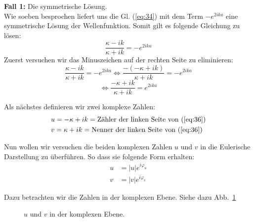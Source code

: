 \textbf{ Fall 1:} Die symmetrische Lösung.\\
Wie soeben besprochen liefert uns die Gl. (\ref{eq:34}) mit dem Term $-e^{2ika}$
eine symmetrische Lösung der Wellenfunktion. Somit gilt es folgende Gleichung zu
lösen:
\begin{equation}
  \label{eq:35}
  \frac{\kappa-ik}{\kappa+ik}=-e^{2ika}
\end{equation}
Zuerst versuchen wir das Minuszeichen auf der rechten Seite zu eliminieren:
\begin{equation*}
  \frac{\kappa-ik}{\kappa+ik}=-e^{2ika}
  \Leftrightarrow  
 \frac{-(-\kappa+ik)}{\kappa+ik}=-e^{2ika}
\end{equation*}
\begin{equation}
  \label{eq:36}
  \Leftrightarrow \frac{-\kappa+ik}{\kappa+ik}=e^{2ika}
\end{equation}

Als nächstes definieren wir zwei komplexe Zahlen: 
\begin{align*}
  &u=-\kappa+ik = \text{Zähler der linken Seite von (\ref{eq:36})}\\
  &v=\kappa+ik = \text{Nenner der linken Seite von (\ref{eq:36})}
\end{align*}

Nun wollen wir versuchen die beiden komplexen Zahlen $u$ und $v$ in die Eulerische
Darstellung zu überführen. So dass sie folgende Form erhalten:
\begin{subequations}
\begin{align}
  u&=|u|e^{i\varphi_u}\label{eq:37a}\\
  v&=|v|e^{i\varphi_v}\label{eq:37b}
\end{align}
\end{subequations}

Dazu betrachten wir die Zahlen in der komplexen Ebene. Siehe dazu
Abb.~\ref{fig:8}

\begin{figure}[htbp]
  \begin{center}
    
    \caption{$u$ und $v$ in der komplexen Ebene.}
    \label{fig:8}
  \end{center}
\end{figure}


